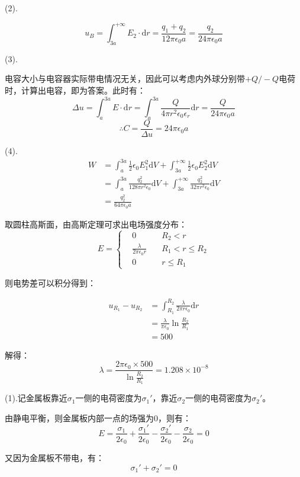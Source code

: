 \documentclass[b5paper,opensource,sourcefont,parskip]{qyxf-book}
\newcommand{\di}[1]{\mathrm{d}#1}
\begin{document}
(2).

\[u_B=\int_{3a}^{+\infty}E_2\cdot \di{r}=\frac{q_1+q_2}{12\pi\epsilon_0a}=\frac{q_2}{24\pi\epsilon_0a}\]

(3).

电容大小与电容器实际带电情况无关，因此可以考虑内外球分别带$ +Q/-Q $电荷时，计算出电容，即为答案。此时有：
\[\Delta u=\int_a^{3a}E\cdot \di{r}=\int_a^{3a}\frac{Q}{4\pi r^2\epsilon_0\epsilon_r}\di{r}=\frac{Q}{24\pi\epsilon_0a}\]
\[\therefore C=\frac{Q}{\Delta u}=24\pi\epsilon_0a\]

(4).
\begin{align*}
W&=\int_a^{3a}\frac{1}{2}\epsilon_0 E_1^2\di{V}+\int_{3a}^{+\infty}\frac{1}{2}\epsilon_0 E_2^2\di{V}\\
&=\int_a^{3a}\frac{q_2^2}{128\pi r^2\epsilon_0} \di{V}+\int_{3a}^{+\infty}\frac{q_2^2}{32\pi r^2\epsilon_0}\di{V}\\
&=\frac{q_2^2}{64\pi\epsilon_0a}
\end{align*}


\solve 取圆柱高斯面，由高斯定理可求出电场强度分布：
\begin{equation}
E=\left\{
\begin{aligned}
&0\quad &R_2<r\\
&\frac{\lambda}{2\pi\epsilon_0 r}\quad &R_1<r\leqslant R_2\\
&0	&r\leqslant R_1
\end{aligned}
\right.
\end{equation}

则电势差可以积分得到：

\begin{align*}
u_{R_1}-u_{R_2}&=\int_{R_1}^{R_2} \frac{\lambda}{2\pi r\epsilon_0} \di{r}\\
&=\frac{\lambda}{\pi\epsilon_0}\ln\frac{R_2}{R_1}\\
&=500
\end{align*}


解得：
\[\lambda=\frac{2\pi\epsilon_0\times 500}{\ln\frac{R_2}{R_1}}=1.208\times 10^{-8}\]


\solve 
(1).记金属板靠近$ \sigma_1 $一侧的电荷密度为$ \sigma_1' $，靠近$ \sigma_2 $一侧的电荷密度为$ \sigma_2' $。

由静电平衡，则金属板内部一点的场强为$ 0 $，则有：
\[E=\frac{\sigma_1}{2\epsilon_0}+\frac{\sigma_1'}{2\epsilon_0}-\frac{\sigma_2'}{2\epsilon_0}-\frac{\sigma_2}{2\epsilon_0}=0\]

又因为金属板不带电，有：
\[\sigma_1'+\sigma_2'=0\]
\end{document}
